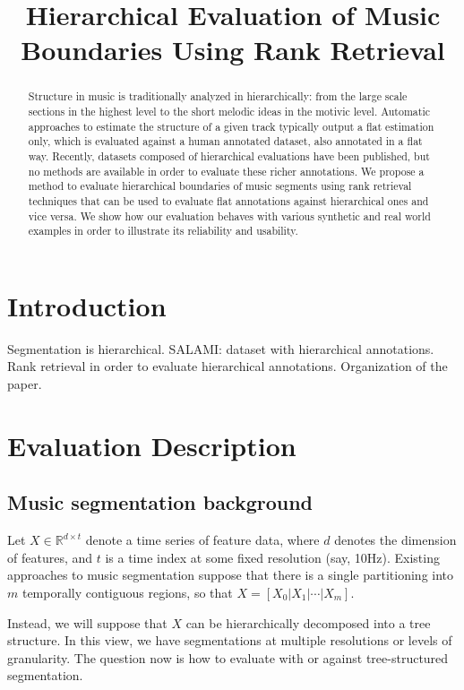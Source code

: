 \documentclass{article}
\title{Hierarchical Evaluation of Music Boundaries Using Rank Retrieval}
\begin{document}
%
\maketitle
%
\begin{abstract}
  Structure in music is traditionally analyzed in hierarchically: from the large scale sections in the highest level to the short melodic ideas in the motivic level. 
  Automatic approaches to estimate the structure of a given track typically output a flat estimation only, which is evaluated against a human annotated dataset, also annotated in a flat way.
  Recently, datasets composed of hierarchical evaluations have been published, but no methods are available in order to evaluate these richer annotations.
  We propose a method to evaluate hierarchical boundaries of music segments using rank retrieval techniques that can be used to evaluate flat annotations against hierarchical ones and vice versa.
  We show how our evaluation behaves with various synthetic and real world examples in order to illustrate its reliability and usability. 
\end{abstract}
%
\section{Introduction}\label{sec:introduction}

Segmentation is hierarchical.
SALAMI: dataset with hierarchical annotations.
Rank retrieval in order to evaluate hierarchical annotations.
Organization of the paper.

\section{Evaluation Description}\label{sec:eval_desc}

\subsection{Music segmentation background}

Let $X \in \mathbb{R}^{d\times t}$ denote a time series of feature data, where $d$ denotes the dimension of features, and $t$ is a time index at some fixed resolution (say, 10Hz).
Existing approaches to music segmentation suppose that there is a single partitioning into $m$ temporally contiguous regions, so that $X=[X_0|X_1|\cdots|X_m]$.

Instead, we will suppose that $X$ can be hierarchically decomposed into a tree structure.
In this view, we have segmentations at multiple resolutions or levels of granularity.
The question now is how to evaluate with or against tree-structured segmentation.
\end{document}
